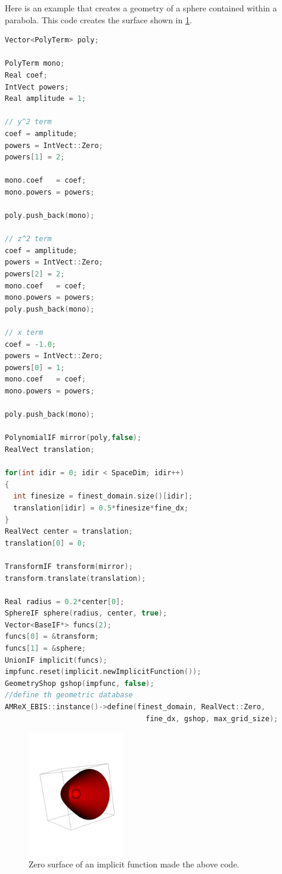 Here is an example that creates a geometry of a sphere contained
within a parabola. This code
creates the surface shown in \ref{fig::parabolasphere}.

\begin{lstlisting}[language=cpp]
Vector<PolyTerm> poly;

PolyTerm mono;
Real coef;
IntVect powers;
Real amplitude = 1;

// y^2 term
coef = amplitude;
powers = IntVect::Zero;
powers[1] = 2;

mono.coef   = coef;
mono.powers = powers;

poly.push_back(mono);

// z^2 term
coef = amplitude;
powers = IntVect::Zero;
powers[2] = 2;
mono.coef   = coef;
mono.powers = powers;
poly.push_back(mono);

// x term
coef = -1.0;
powers = IntVect::Zero;
powers[0] = 1;
mono.coef   = coef;
mono.powers = powers;

poly.push_back(mono);

PolynomialIF mirror(poly,false);
RealVect translation;

for(int idir = 0; idir < SpaceDim; idir++)
{
  int finesize = finest_domain.size()[idir];
  translation[idir] = 0.5*finesize*fine_dx;
}
RealVect center = translation;
translation[0] = 0;

TransformIF transform(mirror);
transform.translate(translation);

Real radius = 0.2*center[0];
SphereIF sphere(radius, center, true);
Vector<BaseIF*> funcs(2);
funcs[0] = &transform;
funcs[1] = &sphere;
UnionIF implicit(funcs);
impfunc.reset(implicit.newImplicitFunction());
GeometryShop gshop(impfunc, false);
//define th geometric database
AMReX_EBIS::instance()->define(finest_domain, RealVect::Zero,
                                 fine_dx, gshop, max_grid_size);
\end{lstlisting}

\begin{figure}[h]
  \centering
  \includegraphics[width=0.375\textwidth]{./EB/parabsphere.pdf}
  \caption{\label{fig::parabolasphere} Zero surface of an implicit
    function made the above code.}
\end{figure}

